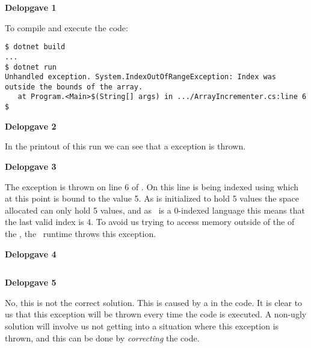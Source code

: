 \textbf{Delopgave 1}

To compile and execute the code:
\begin{verbatim}
$ dotnet build
...
$ dotnet run
Unhandled exception. System.IndexOutOfRangeException: Index was outside the bounds of the array.
   at Program.<Main>$(String[] args) in .../ArrayIncrementer.cs:line 6
$ 
\end{verbatim}

\textbf{Delopgave 2}

In the printout of this run we can see that a  exception is thrown.

\textbf{Delopgave 3}

The exception is thrown on line 6 of . On this line  is being indexed using  which at this point is bound to the value 5. As  is initialized to hold 5 values the space allocated can only hold 5 values, and as \csharp\ is a 0-indexed language this means that the last valid index is 4. To avoid us trying to access memory outside of the  of the , the \csharp\ runtime throws this exception.


\textbf{Delopgave 4}

\inputminted{csharp}{\context/answer/ArrayIncrementer.cs}

\textbf{Delopgave 5}

No, this is not the correct solution. This is caused by a  in the code. It is clear to us that this exception will be thrown every time the code is executed. A non-ugly solution will involve us not getting into a situation where this exception is thrown, and this can be done by \textsl{correcting} the code.

